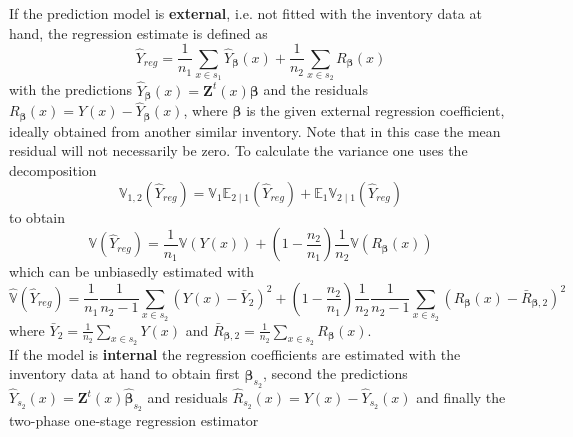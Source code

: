 \documentclass[a4paper,12pt,leqno, titlepage]{article}
\newcommand{\EX}{\mathbb{E}}
\newcommand{\VAR}{\mathbb{V}}
\begin{document}
If the prediction model is \textbf{external}, i.e. not fitted with the inventory data at hand, the regression estimate is defined as
\begin{equation}\label{external1}
\hat{Y}_{reg}=\frac{1}{n_1}\sum_{x\in{s_1}}\hat{Y}_{\pmb{\beta}}(x)+ \frac{1}{n_2}\sum_{x\in{s_2}}R_{\pmb{\beta}}(x)
\end{equation}
with the predictions $\hat{Y}_{\pmb{\beta}}(x)=\pmb{Z}^t(x)\pmb{\beta}$ and the residuals $R_{\pmb{\beta}}(x)=Y(x)-\hat{Y}_{\pmb{\beta}}(x)$, where $\pmb{\beta}$ is the given external regression coefficient, ideally obtained from another similar inventory. Note that in this case the mean residual will not necessarily be zero.
To calculate the variance one uses the decomposition
\begin{equation}\label{external2}
\VAR_{1,2}(\hat{Y}_{reg})=\VAR_1\EX_{2\mid 1}(\hat{Y}_{reg})+\EX_1\VAR_{2 \mid 1}(\hat{Y}_{reg})
\end{equation} to obtain
\begin{equation}\label{external3}
\VAR(\hat{Y}_{reg})=\frac{1}{n_1}\VAR(Y(x))+(1-\frac{n_2}{n_1})\frac{1}{n_2}\VAR(R_{\pmb{\beta}}(x))
 \end{equation}
 which can be unbiasedly estimated with
\begin{equation}\label{varexternalsimple}
\hat{\VAR}(\hat{Y}_{reg})=\frac{1}{n_1}\frac{1}{n_2-1}\sum_{x\in{s_2}}(Y(x)-\bar{Y}_2)^2+
(1-\frac{n_2}{n_1})\frac{1}{n_2}\frac{1}{n_2-1}\sum_{x\in{s_2}}(R_{\pmb{\beta}}(x)-\bar{R}_{\pmb{\beta},2})^2
\end{equation}
where $\bar{Y}_2=\frac{1}{n_2}\sum_{x\in{s_2}}Y(x)$ and  $\bar{R}_{\pmb{\beta},2}=\frac{1}{n_2}\sum_{x\in{s_2}}R_{\pmb{\beta}}(x)$.\\
If the model is \textbf{internal} the regression coefficients are estimated with the inventory data at hand to obtain first $\hat{\pmb{\beta}}_{s_2}$, second the predictions $\hat{Y}_{s_2}(x)=\pmb{Z}^t(x)\hat{\pmb{\beta}}_{s_2}$
and residuals $\hat{R}_{s_2}(x)=Y(x)-\hat{Y}_{s_2}(x)$ and finally the two-phase one-stage regression estimator
\end{document}
